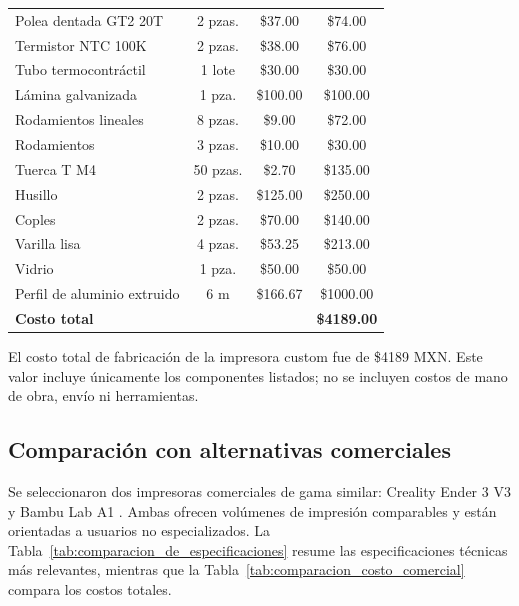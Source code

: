\begin{table}[H]
\begin{tabular}{lccc}
        Polea dentada GT2 20T           & 2 pzas.           & \$37.00  & \$74.00  \\
        Termistor NTC 100K              & 2 pzas.           & \$38.00  & \$76.00  \\
        Tubo termocontráctil            & 1 lote            & \$30.00  & \$30.00  \\
        Lámina galvanizada              & 1 pza.            & \$100.00 & \$100.00 \\
        Rodamientos lineales            & 8 pzas.           & \$9.00   & \$72.00  \\
        Rodamientos                     & 3 pzas.           & \$10.00  & \$30.00  \\
        Tuerca T M4                     & 50 pzas.          & \$2.70   & \$135.00 \\
        Husillo                         & 2 pzas.           & \$125.00 & \$250.00 \\
        Coples                          & 2 pzas.           & \$70.00  & \$140.00 \\
        Varilla lisa                    & 4 pzas.           & \$53.25  & \$213.00 \\
        Vidrio                          & 1 pza.            & \$50.00  & \$50.00  \\
        Perfil de aluminio extruido     & 6 m               & \$166.67 & \$1000.00 \\
        \midrule
        \textbf{Costo total}            &                   &          & \textbf{\$4189.00} \\
        \bottomrule
    \end{tabular}
\end{table}

El costo total de fabricación de la impresora custom fue de \$4189 MXN. Este valor incluye únicamente los componentes listados; no se incluyen costos de mano de obra, envío ni herramientas.

\subsection{Comparación con alternativas comerciales}
Se seleccionaron dos impresoras comerciales de gama similar: Creality Ender 3 V3\cite{creality_ender3v3} y Bambu Lab A1 \cite{bambu_a1}. Ambas ofrecen volúmenes de impresión comparables y están orientadas a usuarios no especializados. La Tabla~\ref{tab:comparacion_de_especificaciones} resume las especificaciones técnicas más relevantes, mientras que la Tabla~\ref{tab:comparacion_costo_comercial} compara los costos totales.

